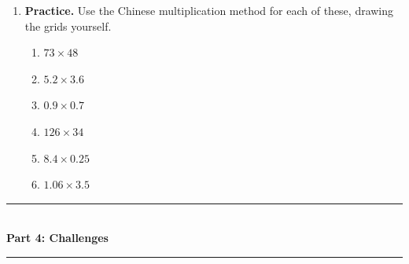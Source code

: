 \documentclass[12pt,a4paper]{article}
\newcommand{\heading}[1]{%
  \vspace{2pt}
  {\color{blue!45!black}\rule{\linewidth}{1pt}}\\[1pt]
  {\large\bfseries #1}\\[-6pt]
  {\color{blue!45!black}\rule{\linewidth}{0.4pt}}
  \vspace{2pt}}
\newcommand{\parttitle}[2]{\heading{Part #1: #2}}
\begin{document}
\begin{enumerate}[resume]
\begin{minipage}[t]{0.46\linewidth}
\vspace{13em}
\end{minipage}\hfill
\begin{minipage}[t]{0.46\linewidth}
(b) A rectangular tile measures $4.8$ cm by $2.5$ cm. What is its area?

\vspace{13em}
\end{minipage}

\item \textbf{Practice.} Use the Chinese multiplication method for each of
these, drawing the grids yourself.
\begin{multicols}{3}
\begin{enumerate}
  \item $73\times48$
  \item $5.2\times3.6$
  \item $0.9\times0.7$
  \item $126\times34$
  \item $8.4\times0.25$
  \item $1.06\times3.5$
\end{enumerate}
\end{multicols}
\vspace{26em}

\end{enumerate}

\newpage

\parttitle{4}{Challenges}
\end{document}
